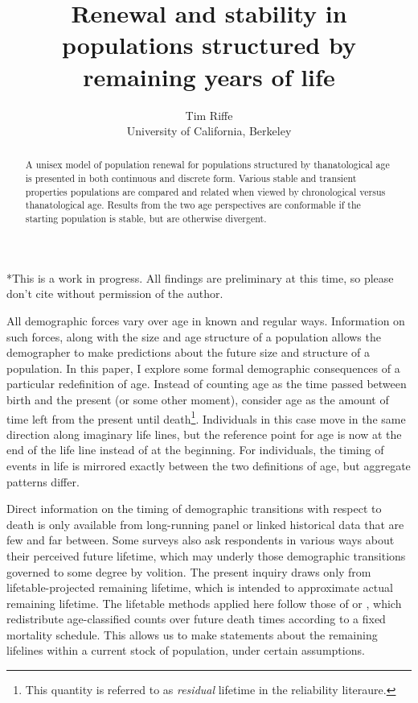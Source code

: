 \documentclass{article}
\begin{document}
\title{Renewal and stability in populations structured by remaining
years of life}
\author{Tim Riffe \\ University of California, Berkeley}
\maketitle

\begin{abstract}
A unisex model of population renewal for populations structured by
thanatological age is presented in both continuous and discrete form. Various
stable and transient properties populations are compared and related when viewed
by chronological versus thanatological age. Results from the two age perspectives are conformable if the starting
population is stable, but are otherwise divergent.
\end{abstract}

*This is a work in progress. All findings are preliminary at this time, so
please don't cite without permission of the author.
\vspace{2em}

\onehalfspacing
All demographic forces vary over age in known and regular ways. Information on
such forces, along with the size and age structure of a population allows the
demographer to make predictions about the future size and structure of a population. In this
paper, I explore some formal demographic consequences of a particular
redefinition of age. Instead of counting age as the time passed between birth and the present (or
some other moment), consider age as the amount of time left from the present
until death\footnote{This quantity is referred to as \textit{residual} lifetime
in the reliability literaure.}. Individuals in this case move in the same
direction along imaginary life lines, but the reference point for age is now at
the end of the life line instead of at the beginning. For individuals, the
timing of events in life is mirrored exactly between the two definitions of age,
but aggregate patterns differ.

Direct information on the timing of demographic transitions with respect to
death is only available from long-running panel or linked historical data that are few and far between. Some surveys also ask respondents in various ways about
their perceived future lifetime, which may underly those
demographic transitions governed to some degree by volition. The present inquiry
draws only from lifetable-projected remaining lifetime, which
is intended to approximate actual remaining lifetime.
The lifetable methods applied here follow those of \citet{brouard1986structure}
or \citet{miller2001increasing}, which redistribute age-classified counts over
future death times according to a fixed mortality schedule. This allows us to make statements about the remaining lifelines within a current stock of population, under certain assumptions.
\end{document}

